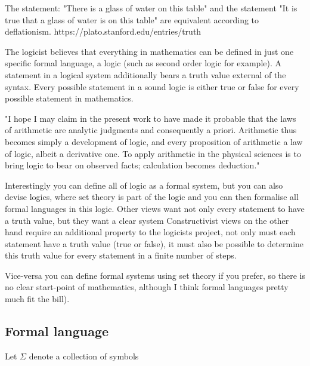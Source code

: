 The statement: "There is a glass of water on this table" and the statement "It is true that a glass of water is on this table" are equivalent according to deflationism.
https://plato.stanford.edu/entries/truth

The logicist believes that everything in mathematics can be defined in just one specific formal language, a logic (such as second order logic for example). A statement in a logical system additionally bears a truth value external of the syntax. Every possible statement in a sound logic is either true or false for every possible statement in mathematics.

"I hope I may claim in the present work to have made it probable that the laws of arithmetic are analytic judgments and consequently a priori. Arithmetic thus becomes simply a development of logic, and every proposition of arithmetic a law of logic, albeit a derivative one. To apply arithmetic in the physical sciences is to bring logic to bear on observed facts; calculation becomes deduction."

Interestingly you can define all of logic as a formal system, but you can also devise logics, where set theory is part of the logic and you can then formalise all formal languages in this logic.
Other views want not only every statement to have a truth value, but they want a clear system 
Constructivist views on the other hand require an additional property to the logicists project, not only must each statement have a truth value (true or false), it must also be possible to determine this truth value for every statement in a finite number of steps.



Vice-versa you can define formal systems using set theory if you prefer, so there is no clear start-point of mathematics, although I think formal languages pretty much fit the bill).
\subsection{Formal language}
Let $\Sigma$ denote a collection of symbols 


